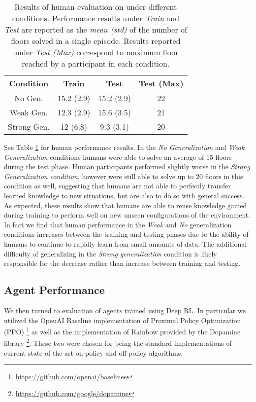 \documentclass{article}
\begin{document}
\begin{table}
\begin{center}
 \begin{tabular}{||c c c c||} 
 \hline
 Condition & Train & Test & Test (Max) \\ [0.5ex] 
 \hline\hline
 No Gen. & 15.2 (2.9) & 15.2 (2.9) & 22 \\ 
 \hline
 Weak Gen. & 12.3 (2.9) & 15.6 (3.5) & 21 \\
 \hline
 Strong Gen. & 12 (6.8) & 9.3 (3.1) & 20 \\
 \hline
\end{tabular}
\end{center}
\caption{Results of human evaluation on under different conditions. Performance results under \emph{Train} and \emph{Test} are reported as the \emph{mean (std)} of the number of floors solved in a single episode. Results reported under \emph{Test (Max)} correspond to maximum floor reached by a participant in each condition.}
\label{table:humanResults}
\end{table}

See Table \ref{table:humanResults} for human performance results. In the \emph{No Generalization} and \emph{Weak Generalization} conditions humans were able to solve an average of 15 floors during the test phase. Human participants performed slightly worse in the \emph{Strong Generalization condition}, however were still able to solve up to 20 floors in this condition as well, suggesting that humans are not able to perfectly transfer learned knowledge to new situations, but are also to do so with general success. As expected, these results show that humans are able to reuse knowledge gained during training to perform well on new unseen configurations of the environment. In fact we find that human performance in the \emph{Weak} and \emph{No} generalization conditions increases between the training and testing phases due to the ability of humans to continue to rapidly learn from small amounts of data. The additional difficulty of generalizing in the \emph{Strong generalization} condition is likely responsible for the decrease rather than increase between training and testing.

\subsection{Agent Performance}

We then turned to evaluation of agents trained using Deep RL. In particular we utilized the OpenAI Baseline implementation of Proximal Policy Optimization (PPO) \cite{schulman2017proximal,baselines}\footnote{\url{https://github.com/openai/baselines}} as well as the implementation of Rainbow provided by the  Dopamine library \cite{hessel2018rainbow,castro2018dopamine}\footnote{\url{https://github.com/google/dopamine}}. These two were chosen for being the standard implementations of current state of the art on-policy and off-policy algorithms. 
\end{document}
